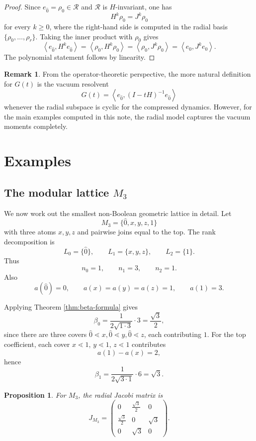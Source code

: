\documentclass[11pt]{amsart}
\newtheorem{prop}[thm]{Proposition}
\theoremstyle{definition}
\newtheorem{remark}[thm]{Remark}
\newcommand{\cc}{\mathcal}
\newcommand{\ip}[2]{\left\langle #1, #2 \right\rangle}
\newcommand{\zero}{\hat{0}}
\newcommand{\one}{{1}}
\begin{document}
\begin{proof}
Since $e_{\zero}=\rho_0\in \cc R$ and $\cc R$ is $H$-invariant, one has
\[
H^k\rho_0=J^k\rho_0
\]
for every $k\ge 0$, where the right-hand side is computed in the radial basis
$\{\rho_0,\dots,\rho_r\}$.  Taking the inner product with $\rho_0$ gives
\[
\ip{e_{\zero}}{H^k e_{\zero}}
=
\ip{\rho_0}{H^k\rho_0}
=
\ip{\rho_0}{J^k\rho_0}
=
\ip{e_0}{J^k e_0}.
\]
The polynomial statement follows by linearity.
\end{proof}


\begin{remark}
From the operator-theoretic perspective, the more natural definition for $G(t)$ is the vacuum resolvent
\[
G(t)=\ip{e_{\zero}}{(I-tH)^{-1}e_{\zero}}
\]
whenever the radial subspace is cyclic for the compressed dynamics.  However, for the main examples computed in this note, the radial model captures the vacuum moments completely.
\end{remark}

\section{Examples}

\subsection{The modular lattice $M_3$}

We now work out the smallest non-Boolean geometric lattice in detail.
Let
\[
M_3=\{\zero,x,y,z,\one\}
\]
with three atoms $x,y,z$ and pairwise joins equal to the top.  The rank decomposition is
\[
L_0=\{\zero\},\qquad L_1=\{x,y,z\},\qquad L_2=\{\one\}.
\]
Thus
\[
n_0=1,\qquad n_1=3,\qquad n_2=1.
\]
Also
\[
a(\zero)=0,\qquad a(x)=a(y)=a(z)=1,\qquad a(\one)=3.
\]

Applying Theorem \ref{thm:beta-formula} gives
\[
\beta_0=\frac{1}{2\sqrt{1\cdot 3}}\cdot 3=\frac{\sqrt{3}}{2},
\]
since there are three covers $\zero\lessdot x,\zero\lessdot y,\zero\lessdot z$, each contributing $1$.
For the top coefficient, each cover $x\lessdot \one$, $y\lessdot \one$, $z\lessdot \one$ contributes
\[
a(\one)-a(x)=2,
\]
hence
\[
\beta_1=
\frac{1}{2\sqrt{3\cdot 1}} \cdot 6
=\sqrt{3}.
\]

\begin{prop}
For $M_3$, the radial Jacobi matrix is
\[
J_{M_3}=
\begin{pmatrix}
0 & \frac{\sqrt{3}}{2} & 0\\
\frac{\sqrt{3}}{2} & 0 & \sqrt{3}\\
0 & \sqrt{3} & 0
\end{pmatrix}.
\]
\end{prop}
\end{document}
